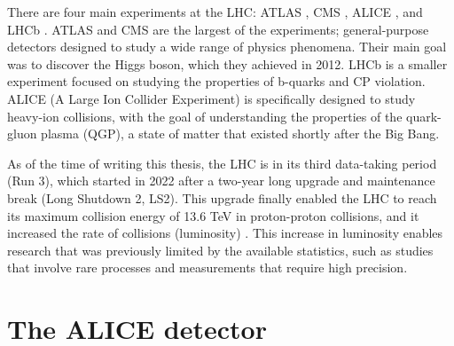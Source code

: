   There are four main experiments at the LHC: ATLAS \cite{ATLAS}, CMS \cite{CMS}, ALICE \cite{ALICE}, and LHCb \cite{LHCb}. ATLAS and CMS are the largest of the experiments; general-purpose detectors designed to study a wide range of physics phenomena. Their main goal was to discover the Higgs boson, which they achieved in 2012. \cite{ATLASHiggs,CMSHiggs} LHCb is a smaller experiment focused on studying the properties of b-quarks and CP violation. \cite{LHCb} ALICE (A Large Ion Collider Experiment) is specifically designed to study heavy-ion collisions, with the goal of understanding the properties of the quark-gluon plasma (QGP), a state of matter that existed shortly after the Big Bang. \cite{ALICE}
  
  As of the time of writing this thesis, the LHC is in its third data-taking period (Run 3), which started in 2022 after a two-year long upgrade and maintenance break (Long Shutdown 2, LS2). This upgrade finally enabled the LHC to reach its maximum collision energy of 13.6 TeV in proton-proton collisions, and it increased the rate of collisions (luminosity) . This increase in luminosity enables research that was previously limited by the available statistics, such as studies that involve rare processes and measurements that require high precision. 

\section{The ALICE detector}

